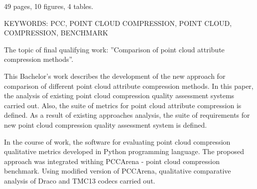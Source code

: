 49 pages, 10 figures, 4 tables.

KEYWORDS: PCC, POINT CLOUD COMPRESSION, POINT CLOUD, COMPRESSION, BENCHMARK

The topic of final qualifying work: ''Comparison of point cloud attribute compression methods''.

This Bachelor's work describes the development of the new approach for
comparison of different point cloud attribute compression methods. In this
paper, the analysis of existing point cloud compression quality assessment
systems carried out. Also, the suite of metrics for point cloud attribute
compression is defined. As a result of existing approaches analysis, the suite
of requirements for new point cloud compression quality assessment system is
defined.

In the course of work, the software for evaluating point cloud compression
qualitative metrics developed in Python programming language. The proposed
approach was integrated withing PCCArena - point cloud compression benchmark.
Using modified version of PCCArena, qualitative comparative analysis of Draco
and TMC13 codecs carried out.